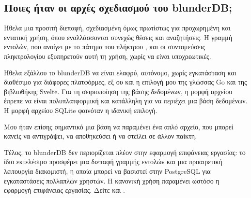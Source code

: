 \documentclass[letterpaper,10pt,greek]{sphinxmanual}
\begin{document}
\subsection{Ποιες ήταν οι αρχές σχεδιασμού του blunderDB;}
\label{\detokenize{faq:quelles-ont-ete-les-principes-de-conception-de-blunderdb}}
\sphinxAtStartPar
Ήθελα μια προσιτή διεπαφή, σχεδιασμένη όμως πρωτίστως για προχωρημένη και εντατική χρήση, όπου εναλλάσσονται συνεχώς θέσεις και αναζητήσεις. Η γραμμή εντολών, που ανοίγει με το πάτημα του πλήκτρου , και οι συντομεύσεις πληκτρολογίου εξυπηρετούν αυτή τη χρήση, χωρίς να είναι υποχρεωτικές.

\sphinxAtStartPar
Ήθελα εξάλλου το blunderDB να είναι ελαφρύ, αυτόνομο, χωρίς εγκατάσταση και διαθέσιμο για διάφορες πλατφόρμες, εξ ου και η επιλογή μου της γλώσσας Go και της βιβλιοθήκης Svelte. Για τη σειριοποίηση της βάσης δεδομένων, η μορφή αρχείου έπρεπε να είναι πολυπλατφορμική και κατάλληλη για να περιέχει μια βάση δεδομένων. Η μορφή αρχείου SQLite φαινόταν η ιδανική επιλογή.

\sphinxAtStartPar
Μου ήταν επίσης σημαντικό μια βάση να παραμένει ένα απλό αρχείο, που μπορεί κανείς να αντιγράψει, να αποθηκεύσει ή να στείλει σε άλλον παίκτη.

\sphinxAtStartPar
Τέλος, το blunderDB δεν περιορίζεται πλέον στην εφαρμογή επιφάνειας εργασίας: το ίδιο εκτελέσιμο προσφέρει μια διεπαφή γραμμής εντολών και μια προαιρετική λειτουργία διακομιστή, η οποία μπορεί να βασιστεί στην PostgreSQL για εγκαταστάσεις πολλαπλών χρηστών. Η κανονική χρήση παραμένει ωστόσο η εφαρμογή επιφάνειας εργασίας. Δείτε {\hyperref[\detokenize{cli:cli}]{}} και {\hyperref[\detokenize{mode_headless:headless}]{}}.
\end{document}
